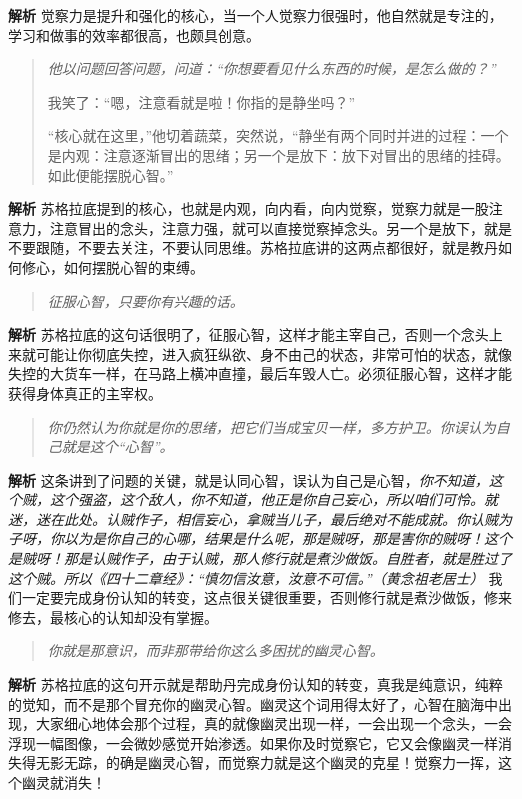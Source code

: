 \textbf{解析} 觉察力是提升和强化的核心，当一个人觉察力很强时，他自然就是专注的，学习和做事的效率都很高，也颇具创意。

\begin{quotation}\it
    他以问题回答问题，问道：“你想要看见什么东西的时候，是怎么做的？”

    我笑了：“嗯，注意看就是啦！你指的是静坐吗？”

    “核心就在这里，”他切着蔬菜，突然说，“静坐有两个同时并进的过程：一个是内观：注意逐渐冒出的思绪；另一个是放下：放下对冒出的思绪的挂碍。如此便能摆脱心智。”
\end{quotation}

\textbf{解析} 苏格拉底提到的核心，也就是内观，向内看，向内觉察，觉察力就是一股注意力，注意冒出的念头，注意力强，就可以直接觉察掉念头。另一个是放下，就是不要跟随，不要去关注，不要认同思维。苏格拉底讲的这两点都很好，就是教丹如何修心，如何摆脱心智的束缚。

\begin{quote}\it
    征服心智，只要你有兴趣的话。
\end{quote}

\textbf{解析} 苏格拉底的这句话很明了，征服心智，这样才能主宰自己，否则一个念头上来就可能让你彻底失控，进入疯狂纵欲、身不由己的状态，非常可怕的状态，就像失控的大货车一样，在马路上横冲直撞，最后车毁人亡。必须征服心智，这样才能获得身体真正的主宰权。

\begin{quote}\it
    你仍然认为你就是你的思绪，把它们当成宝贝一样，多方护卫。你误认为自己就是这个“心智”。
\end{quote}

\textbf{解析} 这条讲到了问题的关键，就是认同心智，误认为自己是心智，\textit{你不知道，这个贼，这个强盗，这个敌人，你不知道，他正是你自己妄心，所以咱们可怜。就迷，迷在此处。认贼作子，相信妄心，拿贼当儿子，最后绝对不能成就。你认贼为子呀，你以为是你自己的心哪，结果是什么呢，那是贼呀，那是害你的贼呀！这个是贼呀！那是认贼作子，由于认贼，那人修行就是煮沙做饭。自胜者，就是胜过了这个贼。所以《四十二章经》：“慎勿信汝意，汝意不可信。”（黄念祖老居士）} 我们一定要完成身份认知的转变，这点很关键很重要，否则修行就是煮沙做饭，修来修去，最核心的认知却没有掌握。

\begin{quote}\it
    你就是那意识，而非那带给你这么多困扰的幽灵心智。
\end{quote}

\textbf{解析} 苏格拉底的这句开示就是帮助丹完成身份认知的转变，真我是纯意识，纯粹的觉知，而不是那个冒充你的幽灵心智。幽灵这个词用得太好了，心智在脑海中出现，大家细心地体会那个过程，真的就像幽灵出现一样，一会出现一个念头，一会浮现一幅图像，一会微妙感觉开始渗透。如果你及时觉察它，它又会像幽灵一样消失得无影无踪，的确是幽灵心智，而觉察力就是这个幽灵的克星！觉察力一挥，这个幽灵就消失！

